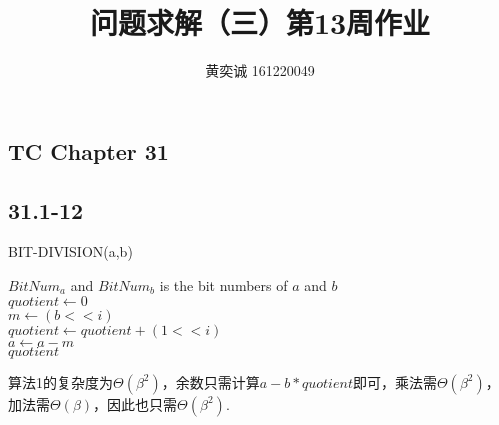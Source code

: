 \documentclass[twocolumn]{article}
\newenvironment{SChinese}{
	\CJKfamily{gbsn}
	\CJKtilde
	\CJKnospace}{}
\begin{document}
	\begin{CJK}{UTF8}{}	
		\begin{SChinese}	
			\title{问题求解（三）第13周作业}
			\author{黄奕诚 161220049}
			\maketitle
			
			\section*{TC Chapter 31}
			\subsection*{31.1-12}
				\begin{algorithm}
					\caption{BIT-DIVISION(a,b)}
					\begin{algorithmic}[1]
						\STATE $BitNum_a$ and $BitNum_b$ is the bit numbers of $a$ and $b$ \\
						\STATE $quotient\leftarrow0$ \\
						\STATE $m\leftarrow(b<<i)$ \\
						\STATE $quotient\leftarrow quotient+(1<<i)$ \\
						\STATE $a\leftarrow a-m$ \\
						\ENDIF
						\ENDFOR
						\RETURN $quotient$
					\end{algorithmic}
				\end{algorithm}
				算法1的复杂度为$\Theta(\beta^2)$，余数只需计算$a-b*quotient$即可，乘法需$\Theta(\beta^2)$，加法需$\Theta(\beta)$，因此也只需$\Theta(\beta^2)$.

\end{SChinese}
\end{CJK}
\end{document}
